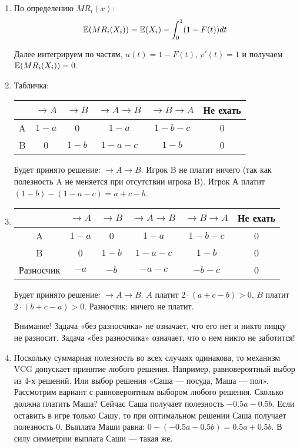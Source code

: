 \begin{enumerate}
\item По определению $ MR_{i}(x) $:
\begin{equation}
\mathbb{E}(MR_{i}(X_{i}))=\mathbb{E}(X_{i})-\int_{0}^{1}(1-F(t))dt
\end{equation}

Далее интегрируем по частям, $ u(t)=1-F(t) $, $ v'(t)=1 $ и получаем $ \mathbb{E}(MR_{i}(X_{i}))=0 $.

\item Табличка:

\begin{tabular}{c|ccccc}
& $ \to A $ & $ \to B $ & $ \to A\to B $ & $ \to B \to A $ & Не ехать \\
\hline
A & $ 1-a $ & 0 & $ 1-a $ & $ 1-b-c $ & 0 \\
B & 0 & $ 1-b $ & $ 1-a-c $ & $ 1-b $ & 0 \\
\end{tabular}

Будет принято решение: $ \to A\to B $. Игрок B не платит ничего (так как полезность A не меняется при отсутствии игрока B). Игрок А платит $ (1-b)-(1-a-c)=a+c-b $.

\item \begin{tabular}{c|ccccc}
& $ \to A $ & $ \to B $ & $ \to A\to B $ & $ \to B \to A $ & Не ехать \\
\hline
A & $ 1-a $ & 0 & $ 1-a $ & $ 1-b-c $ & 0 \\
B & 0 & $ 1-b $ & $ 1-a-c $ & $ 1-b $ & 0 \\
Разносчик & $ -a $ & $ -b $ & $ -a-c $ & $ -b-c $ & 0 \\
\end{tabular}

Будет принято решение: $ \to A\to B $. $ A $ платит $ 2\cdot (a+c-b)>0 $, $ B $ платит $ 2\cdot (b+c-a)>0 $. Разносчик: ничего не платит.

Внимание! Задача «без разносчика» не означает, что его нет и никто пиццу не разносит. Задача «без разносчика» означает, что о нем никто не заботится!

\item Поскольку суммарная полезность во всех случаях одинакова, то механизм VCG допускает принятие любого решения. Например, равновероятный выбор из 4-х решений. Или выбор решения «Саша — посуда, Маша — пол». Рассмотрим вариант с равновероятным выбором любого решения. Сколько должна платить Маша? Сейчас Саша получает полезность $-0.5a-0.5b $. Если оставить в игре только Сашу, то при оптимальном решении Саша получает полезность $ 0 $. Выплата Маши равна: $0-(-0.5a-0.5b)=0.5a+0.5b$. В силу симметрии выплата Саши — такая же.


\end{enumerate}
